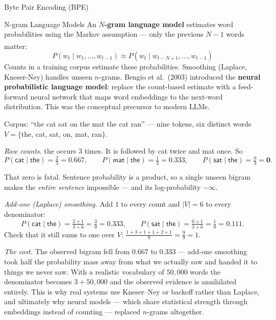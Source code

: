 \begin{v3topic}{Byte Pair Encoding (BPE)}
\begin{v3topic}{N-gram Language Models}
    An \textbf{$N$-gram language model} estimates word probabilities using the Markov assumption --- only the previous $N-1$ words matter\textsuperscript{\cite[][]{bengioNeuralProbabilisticLanguage}}:
    \begin{equation}
        P(w_t \mid w_1, \ldots, w_{t-1})
        \approx
        P(w_t \mid w_{t-N+1}, \ldots, w_{t-1})
    \end{equation}
    Counts in a training corpus estimate these probabilities.
    Smoothing (Laplace, Kneser-Ney) handles unseen $n$-grams.
    Bengio et al.\ (2003) introduced the \textbf{neural probabilistic language model}: replace the count-based estimate with a feed-forward neural network that maps word embeddings to the next-word distribution.
    This was the conceptual precursor to modern LLMs.

\begin{workedexample}
Corpus: \textsf{``the cat sat on the mat the cat ran''} --- nine tokens, six
distinct words $V = \{$the, cat, sat, on, mat, ran$\}$.

\emph{Raw counts.} \textsf{the} occurs $3$ times. It is followed by
\textsf{cat} twice and \textsf{mat} once. So
\[
  P(\textsf{cat}\mid\textsf{the}) = \tfrac{2}{3} = 0.667,
  \qquad
  P(\textsf{mat}\mid\textsf{the}) = \tfrac{1}{3} = 0.333,
  \qquad
  P(\textsf{sat}\mid\textsf{the}) = \tfrac{0}{3} = \mathbf{0}.
\]

That zero is fatal. Sentence probability is a product, so a single unseen
bigram makes the \emph{entire sentence} impossible --- and its log-probability
$-\infty$.

\emph{Add-one (Laplace) smoothing.} Add $1$ to every count and $|V| = 6$ to
every denominator:
\[
  P(\textsf{cat}\mid\textsf{the}) = \tfrac{2+1}{3+6} = \tfrac{3}{9} = 0.333,
  \qquad
  P(\textsf{sat}\mid\textsf{the}) = \tfrac{0+1}{3+6} = \tfrac{1}{9} = 0.111 .
\]
Check that it still sums to one over $V$:
$\tfrac{1+3+1+1+2+1}{9} = \tfrac{9}{9} = 1$. \checkmark

\emph{The cost.} The observed bigram fell from $0.667$ to $0.333$ --- add-one
smoothing took half the probability mass away from what we actually saw and
handed it to things we never saw. With a realistic vocabulary of $50{,}000$
words the denominator becomes $3 + 50{,}000$ and the observed evidence is
annihilated entirely. This is why real systems use Kneser--Ney or backoff rather
than Laplace, and ultimately why neural models --- which share statistical
strength through embeddings instead of counting --- replaced $n$-grams
altogether.
\end{workedexample}


\end{v3topic}
\end{v3topic}

